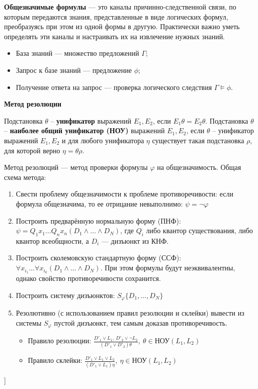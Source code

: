 \textbf{Общезначимые формулы} --- это каналы причинно-следственной связи, по которым передаются знания, представленные в виде логических формул, преобразуясь при этом из одной формы в другую.
Практически важно уметь определять эти каналы и настраивать их на извлечение нужных знаний.
\begin{itemize}
    \item База знаний --- множество предложений $\Gamma$;
    \item Запрос к базе знаний --- предложение $\phi$;
    \item Получение ответа на запрос --- проверка логического следствия $\Gamma \models \phi$.
\end{itemize}

\textbf{Метод резолюции}

Подстановка $\theta$ -- \textbf{унификатор} выражений $E_1, E_2$, если $E_1 \theta = E_2 \theta$. Подстановка $\theta$ -- \textbf{наиболее общий унификатор (НОУ)} выражений $E_1, E_2$, если $\theta$ -- унификатор выражений $E_1, E_2$ и для любого унификатора $\eta$ существует такая подстановка $\rho$, для которой верно $\eta = \theta \rho$.

Метод резолюций --- метод проверки формулы $\varphi$ на общезначимость. 
Общая схема метода:
\begin{enumerate}
    \item Свести проблему общезначимости к проблеме противоречивости: если формула общезначима, то ее отрицание невыполнимо: $\psi = \neg \varphi$
    \item Построить предварённую нормальную форму (ПНФ): $\psi = Q_1x_1 \dots Q_nx_n(D_1 \wedge \dots \wedge D_N)$, где $Q_i$ либо квантор существования, либо квантор всеобщности, а $D_i$ --- дизъюнкт из КНФ.
    \item Построить сколемовскую стандартную форму (ССФ): $\forall x_{i_1} \dots \forall x_{i_k}(D_1 \wedge \dots \wedge D_N)$.
    При этом формулы будут неэквивалентны, однако свойство противоречивости сохранится.
    \item Построить систему дизъюнктов: $S_\varphi \{D_1, \dots, D_N\}$
    \item Резолютивно (с использованием правил резолюции и склейки) вывести из системы $S_\varphi$ пустой дизъюнкт, тем самым доказав противоречивость.
    \begin{itemize}
        \item Правило резолюции: $\frac{D'_1 \vee L_1,~D'_2 \vee \neg L_2}{(D'_1 \vee D'_2)\theta},~\theta \in \text{НОУ}(L_1, L_2)$
        \item Правило склейки: $\frac{D'_1 \vee L_1 \vee L_2}{(D'_1 \vee L_1)\eta},~\eta \in \text{НОУ}(L_1,L_2)$
    \end{itemize}
\end{enumerate}


\bigbreak
[\cite[page 69-96]{replace_me}]